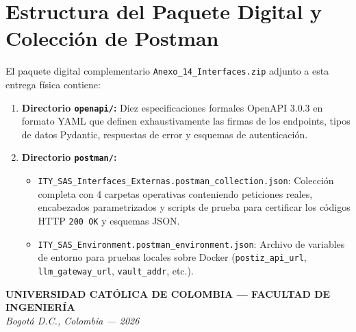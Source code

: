 \documentclass[11pt,a4paper]{article}
\begin{document}
\section{Estructura del Paquete Digital y Colección de Postman}\label{sec:postman}

El paquete digital complementario \texttt{Anexo\_14\_Interfaces.zip} adjunto a esta entrega física contiene:

\begin{enumerate}
    \item \textbf{Directorio \texttt{openapi/}:} Diez especificaciones formales OpenAPI 3.0.3 en formato YAML que definen exhaustivamente las firmas de los endpoints, tipos de datos Pydantic, respuestas de error y esquemas de autenticación.
    \item \textbf{Directorio \texttt{postman/}:}
    \begin{itemize}
        \item \texttt{ITY\_SAS\_Interfaces\_Externas.postman\_collection.json}: Colección completa con 4 carpetas operativas conteniendo peticiones reales, encabezados parametrizados y scripts de prueba para certificar los códigos HTTP \texttt{200 OK} y esquemas JSON.
        \item \texttt{ITY\_SAS\_Environment.postman\_environment.json}: Archivo de variables de entorno para pruebas locales sobre Docker (\texttt{postiz\_api\_url}, \texttt{llm\_gateway\_url}, \texttt{vault\_addr}, etc.).
    \end{itemize}
\end{enumerate}

\begin{center}
\vspace{1cm}
\textbf{UNIVERSIDAD CATÓLICA DE COLOMBIA --- FACULTAD DE INGENIERÍA}\\
\textit{Bogotá D.C., Colombia --- 2026}
\end{center}
\end{document}

